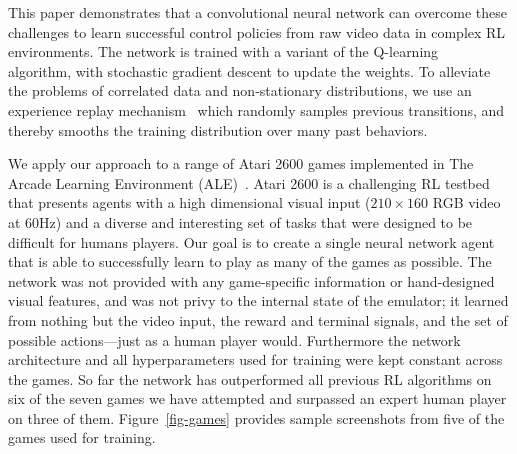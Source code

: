 
This paper demonstrates that a convolutional neural network can overcome these challenges to learn successful control policies from raw video data in complex RL environments.
The network is trained with a variant of the Q-learning~\cite{watkins-qlearning} algorithm, with stochastic gradient descent to update the weights.
To alleviate the problems of correlated data and non-stationary distributions, we use an experience replay mechanism~\cite{lin1993reinforcement} which randomly samples previous transitions, and thereby smooths the training distribution over many past behaviors.


We apply our approach to a range of Atari 2600 games implemented in The Arcade Learning Environment (ALE)~\cite{bellemare-ale}.
Atari 2600 is a challenging RL testbed that presents agents with a high dimensional visual input ($210 \times 160$ RGB video at 60Hz) and a diverse and interesting set of tasks that were designed to be difficult for humans players.
% 
% 
Our goal is to create a single neural network agent that is able to successfully learn to play as many of the games as possible.
The network was not provided with any game-specific information or hand-designed visual features, and was not privy to the internal state of the emulator; it learned from nothing but the video input, the reward and terminal signals, and the set of possible actions---just as a human player would.
Furthermore the network architecture and all hyperparameters used for training were kept constant across the games.
So far the network has outperformed all previous RL algorithms on six of the seven games we have attempted and surpassed an expert human player on three of them.
Figure~\ref{fig-games} provides sample screenshots from five of the games used for training.


